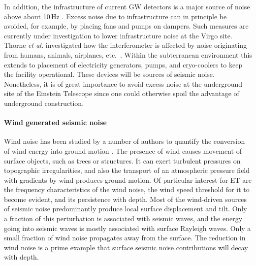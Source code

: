 In addition, the infrastructure of current GW detectors is a major source of noise above about 10\,Hz \cite{CoEA2016a,CoEA2018a}. Excess noise due to infrastructure can in principle be avoided, for example, by placing fans and pumps on dampers. Such measures are currently under investigation to lower infrastructure noise at the Virgo site. Thorne \emph{et al.} investigated how the interferometer is affected by noise originating from humans, animals, airplanes, etc.~\cite{GGthorneWinstein}. Within the subterranean environment this extends to placement of electricity generators, pumps, and cryo-coolers to keep the facility operational. These devices will be sources of seismic noise. Nonetheless, it is of great importance to avoid excess noise at the underground site of the Einstein Telescope since one could otherwise spoil the advantage of underground construction.

\paragraph{Wind generated seismic noise}
Wind noise has been studied by a number of authors to quantify the conversion of wind energy into ground motion \cite{WiEA1996,DABo2012}. The presence of wind causes movement of surface objects, such as trees or structures. It can exert turbulent pressures on topographic irregularities, and also the transport of an atmospheric pressure field with gradients by wind produces ground motion. Of particular interest for ET are the frequency characteristics of the wind noise, the wind speed threshold for it to become evident, and its persistence with depth. Most of the wind-driven sources of seismic noise predominantly produce local surface displacement and tilt. Only a fraction of this perturbation is associated with seismic waves, and the energy going into seismic waves is mostly associated with surface Rayleigh waves. Only a small fraction of wind noise propagates away from the surface. The reduction in wind noise is a prime example that surface seismic noise contributions will decay with depth. 

